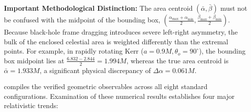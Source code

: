\noindent \textbf{Important Methodological Distinction:} The area centroid $(\bar{\alpha}, \bar{\beta})$ must not be confused with the midpoint of the bounding box, $\left(\frac{\alpha_{\max} + \alpha_{\min}}{2}, \frac{\beta_{\max} + \beta_{\min}}{2}\right)$. Because black-hole frame dragging introduces severe left-right asymmetry, the bulk of the enclosed celestial area is weighted differently than the extremal points. For example, in rapidly rotating Kerr ($a = 0.9M, \theta_o = 90^\circ$), the bounding box midpoint lies at $\frac{6.832 - 2.844}{2} = 1.994M$, whereas the true area centroid is $\bar{\alpha} = 1.933M$, a significant physical discrepancy of $\Delta\alpha = 0.061M$.

 compiles the verified geometric observables across all eight standard configurations. Examination of these numerical results establishes four major relativistic trends:
